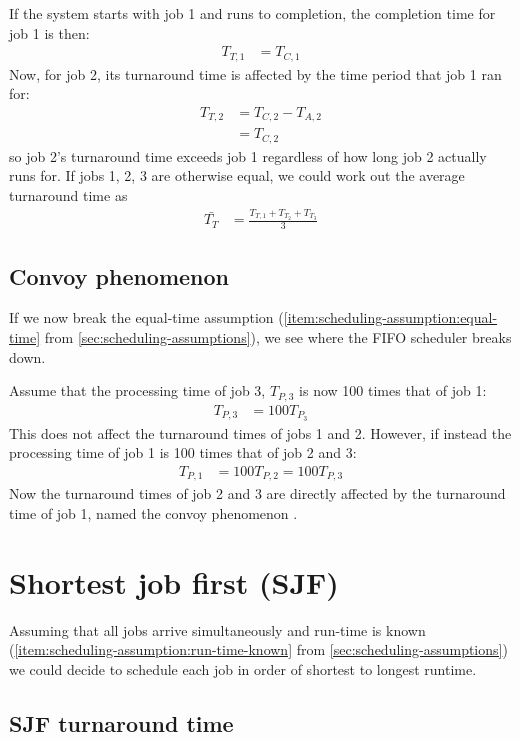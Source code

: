 If the system starts with job 1 and runs to completion, the completion time for job 1 is then: 
\begin{align}
  T_{T,1} & = T_{C,1}
\end{align}
Now, for job 2, its turnaround time is affected by the time period that job 1 ran for:
\begin{align}
  T_{T,2} & = T_{C,2} - T_{A,2} \\
          & = T_{C,2}
\end{align}
so job 2's turnaround time exceeds job 1 regardless of how long job 2 actually runs for.
If jobs 1, 2, 3 are otherwise equal, we could work out the average turnaround time as
\begin{align}
  \bar{T_T} & = \frac{T_{T,1} + T_{T_2} + T_{T_3}}{3} 
\end{align}

\subsection{Convoy phenomenon}

If we now break the equal-time assumption (\ref{item:scheduling-assumption:equal-time} from \autoref{sec:scheduling-assumptions}), we see where the FIFO scheduler breaks down.

Assume that the processing time of job 3, $T_{P,3}$ is now 100 times that of job 1:
\begin{align}
  T_{P,3} & = 100 T_{P_3}
\end{align}
This does not affect the turnaround times of jobs 1 and 2.
However, if instead the processing time of job 1 is 100 times that of job 2 and 3:
\begin{align}
  T_{P,1} & = 100 T_{P,2} = 100 T_{P,3} 
\end{align}
Now the turnaround times of job 2 and 3 are directly affected by the turnaround time of job 1, named the convoy phenomenon \citep{blasgen:1979:the-convoy}.


\section{Shortest job first (SJF)}

Assuming that all jobs arrive simultaneously and run-time is known (\ref{item:scheduling-assumption:run-time-known} from \autoref{sec:scheduling-assumptions}) we could decide to schedule each job in order of shortest to longest runtime.

\subsection{SJF turnaround time}

